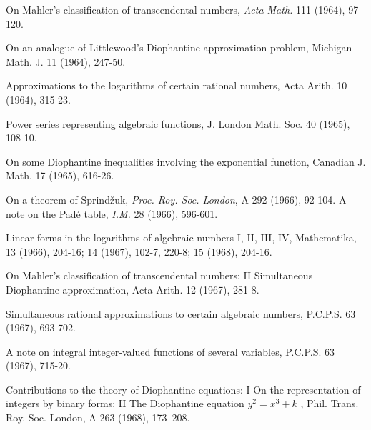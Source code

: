 \begin{hanglist}
    \item \hspace{1.5em} On Mahler's classification of transcendental numbers, \textit{Acta Math.} 111 (1964), 97–120.
    \item \hspace{1.5em} On an analogue of Littlewood's Diophantine approximation problem, Michigan Math. J. 11 (1964), 247-50.
    \item \hspace{1.5em} Approximations to the logarithms of certain rational numbers, Acta Arith. 10 (1964), 315-23.
    \item \hspace{1.5em} Power series representing algebraic functions, J. London Math. Soc. 40 (1965), 108-10.
    \item \hspace{1.5em} On some Diophantine inequalities involving the exponential function, Canadian J. Math. 17 (1965), 616-26.
    \item \hspace{1.5em} On a theorem of Sprindžuk, \textit{Proc. Roy. Soc. London}, A 292 (1966), 92-104. A note on the Padé table, \textit{I.M.} 28 (1966), 596-601.
    \item \hspace{1.5em} Linear forms in the logarithms of algebraic numbers I, II, III, IV, Mathematika, 13 (1966), 204-16; 14 (1967), 102-7, 220-8; 15 (1968), 204-16.
    \item \hspace{1.5em} On Mahler's classification of transcendental numbers: II Simultaneous Diophantine approximation, Acta Arith. 12 (1967), 281-8.
    \item \hspace{1.5em} Simultaneous rational approximations to certain algebraic numbers, P.C.P.S. 63 (1967), 693-702.
    \item \hspace{1.5em} A note on integral integer-valued functions of several variables, P.C.P.S. 63 (1967), 715-20.
    \item \hspace{1.5em} Contributions to the theory of Diophantine equations: I On the representation of integers by binary forms; II The Diophantine equation  $y^2 = x^3 + k$ , Phil. Trans. Roy. Soc. London, A 263 (1968), 173–208.

\end{hanglist}
